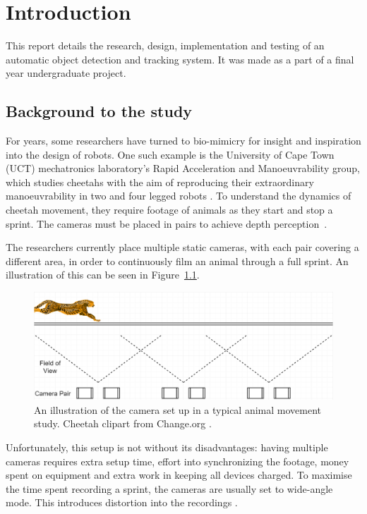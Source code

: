 \chapter{Introduction}
This report details the research, design, implementation and testing of an automatic object detection and tracking system. It was made as a part of a final year undergraduate project.

\section{Background to the study}
For years, some researchers have turned to bio-mimicry for insight and inspiration into the design of robots. One such example is the University of Cape Town (UCT) mechatronics laboratory's Rapid Acceleration and Manoeuvrability group, which studies cheetahs with the aim of reproducing their extraordinary manoeuvrability in two and four legged robots \cite{website:uct_mechatronics}. To understand the dynamics of cheetah movement, they require footage of animals as they start and stop a sprint. The cameras must be placed in pairs to achieve depth perception~\cite{website:depth_perception_from_stereo_camera}.

The researchers currently place multiple static cameras, with each pair covering a different area, in order to continuously film an animal through a full sprint. An illustration of this can be seen in Figure~\ref{fig:multiple_gopro_pairs}. \\

\begin{figure}[h!]
  \centering
  \includegraphics[width=\textwidth]{multiple_gopro_pairs}
  \caption{\label{fig:multiple_gopro_pairs} An illustration of the camera set up in a typical animal movement study. Cheetah clipart from Change.org \cite{website:pic_of_cheetah}.}
\end{figure}

Unfortunately, this setup is not without its disadvantages: having multiple cameras requires extra setup time, effort into synchronizing the footage, money spent on equipment and extra work in keeping all devices charged. To maximise the time spent recording a sprint, the cameras are usually set to wide-angle mode. This introduces distortion into the recordings \cite{website:camera_distorion}.

